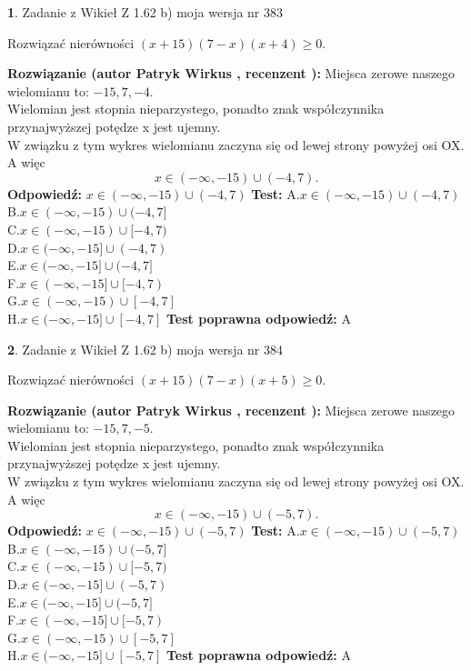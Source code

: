 \documentclass[12pt, a4paper]{article}
\theoremstyle{definition} %
\newtheorem{zad}{}
\newcommand{\zadStart}[1]{\begin{zad}#1\newline}
\newcommand{\zadStop}{\end{zad}}
\newcommand{\rozwStart}[2]{\noindent \textbf{Rozwiązanie (autor #1 , recenzent #2): }\newline}
\newcommand{\rozwStop}{\newline}
\newcommand{\odpStart}{\noindent \textbf{Odpowiedź:}\newline}
\newcommand{\odpStop}{\newline}
\newcommand{\testStart}{\noindent \textbf{Test:}\newline}
\newcommand{\testStop}{\newline}
\newcommand{\kluczStart}{\noindent \textbf{Test poprawna odpowiedź:}\newline}
\newcommand{\kluczStop}{\newline}
\begin{document}
\zadStart{Zadanie z Wikieł Z 1.62 b) moja wersja nr 383}

Rozwiązać nierówności $(x+15)(7-x)(x+4)\ge0$.
\zadStop
\rozwStart{Patryk Wirkus}{}
Miejsca zerowe naszego wielomianu to: $-15, 7, -4$.\\
Wielomian jest stopnia nieparzystego, ponadto znak współczynnika przy\linebreak najwyższej potędze x jest ujemny.\\ W związku z tym wykres wielomianu zaczyna się od lewej strony powyżej osi OX. A więc $$x \in (-\infty,-15) \cup (-4,7).$$
\rozwStop
\odpStart
$x \in (-\infty,-15) \cup (-4,7)$
\odpStop
\testStart
A.$x \in (-\infty,-15) \cup (-4,7)$\\
B.$x \in (-\infty,-15) \cup (-4,7]$\\
C.$x \in (-\infty,-15) \cup [-4,7)$\\
D.$x \in (-\infty,-15] \cup (-4,7)$\\
E.$x \in (-\infty,-15] \cup (-4,7]$\\
F.$x \in (-\infty,-15] \cup [-4,7)$\\
G.$x \in (-\infty,-15) \cup [-4,7]$\\
H.$x \in (-\infty,-15] \cup [-4,7]$
\testStop
\kluczStart
A
\kluczStop



\zadStart{Zadanie z Wikieł Z 1.62 b) moja wersja nr 384}

Rozwiązać nierówności $(x+15)(7-x)(x+5)\ge0$.
\zadStop
\rozwStart{Patryk Wirkus}{}
Miejsca zerowe naszego wielomianu to: $-15, 7, -5$.\\
Wielomian jest stopnia nieparzystego, ponadto znak współczynnika przy\linebreak najwyższej potędze x jest ujemny.\\ W związku z tym wykres wielomianu zaczyna się od lewej strony powyżej osi OX. A więc $$x \in (-\infty,-15) \cup (-5,7).$$
\rozwStop
\odpStart
$x \in (-\infty,-15) \cup (-5,7)$
\odpStop
\testStart
A.$x \in (-\infty,-15) \cup (-5,7)$\\
B.$x \in (-\infty,-15) \cup (-5,7]$\\
C.$x \in (-\infty,-15) \cup [-5,7)$\\
D.$x \in (-\infty,-15] \cup (-5,7)$\\
E.$x \in (-\infty,-15] \cup (-5,7]$\\
F.$x \in (-\infty,-15] \cup [-5,7)$\\
G.$x \in (-\infty,-15) \cup [-5,7]$\\
H.$x \in (-\infty,-15] \cup [-5,7]$
\testStop
\kluczStart
A
\kluczStop
\end{document}
